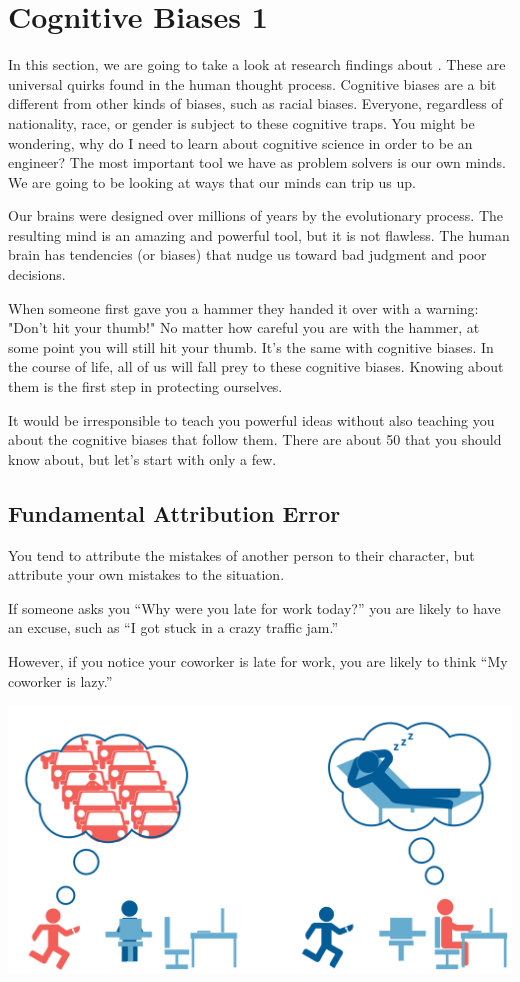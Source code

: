 \chapter{Cognitive Biases 1}

In this section, we are going to take a look at research findings about . These are universal quirks found in the human thought process. Cognitive biases are a bit different from other kinds of biases, such as racial biases. Everyone, regardless of nationality, race, or gender is subject to these cognitive traps. You might be wondering, why do I need to learn about cognitive science in order to be an engineer? The  most important tool we have as problem solvers is our own minds. We are going to be looking at ways that our minds can trip us up.

Our brains were designed over millions of years by the evolutionary
process. The resulting mind is an amazing and powerful tool, but it is
not flawless. The human brain has tendencies (or biases) that nudge us
toward bad judgment and poor decisions.

When someone first gave you a hammer they handed it over with a warning: "Don't hit your thumb!" No matter how careful you are with the hammer, at some point you will still hit your thumb. It's the same with cognitive biases. In the course of life, all of us will fall prey to these cognitive biases. Knowing about them is the first step in protecting ourselves. 

It would be irresponsible to teach you powerful ideas without
also teaching you about the cognitive biases that follow them. There are about 50 that you should know about, but let's start with only a few.

\section{Fundamental Attribution Error}

You tend to attribute
the mistakes of another person to their character, but attribute your
own mistakes to the situation.

If someone asks you ``Why were you late for work today?'' you
are likely to have an excuse, such as ``I got stuck in a crazy traffic jam.''

However, if you notice your coworker is late for work, you are likely to think ``My coworker is lazy.''


\includegraphics[width=1\textwidth]{fundamentalAttributionError.png}

